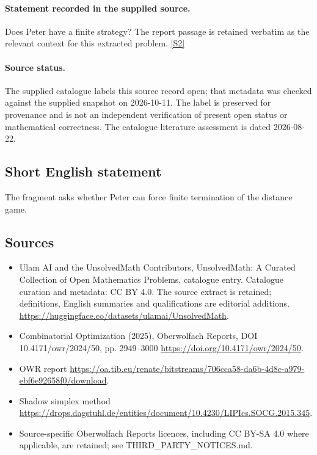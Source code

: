 \documentclass[11pt]{article}
\newcommand{\sref}[2]{\hyperlink{source:#1:#2}{[S#2]}}
\begin{document}
\paragraph{Statement recorded in the supplied source.}
Does Peter have a ﬁnite strategy? The report passage is retained verbatim as the relevant context for this extracted problem. \sref{statement}{2}
\paragraph{Source status.}
The supplied catalogue labels this source record open; that metadata was checked against the supplied snapshot on 2026-10-11. The label is preserved for provenance and is not an independent verification of present open status or mathematical correctness. The catalogue literature assessment is dated 2026-08-22.
\subsection{Short English statement}
The fragment asks whether Peter can force finite termination of the distance game.
\subsection{Sources}
\begin{itemize}
\item[\hypertarget{source:statement:1}{S1}] Ulam AI and the UnsolvedMath Contributors, UnsolvedMath: A Curated Collection of Open Mathematics Problems, catalogue entry. Catalogue curation and metadata: CC BY 4.0. The source extract is retained; definitions, English summaries and qualifications are editorial additions.
\url{https://huggingface.co/datasets/ulamai/UnsolvedMath}.
\item[\hypertarget{source:statement:2}{S2}] Combinatorial Optimization (2025), Oberwolfach Reports, DOI 10.4171/owr/2024/50, pp. 2949--3000
\url{https://doi.org/10.4171/owr/2024/50}.
\item[\hypertarget{source:statement:3}{S3}] OWR report
\url{https://oa.tib.eu/renate/bitstreams/706cca58-da6b-4d8c-a979-ebf6e92658f0/download}.
\item[\hypertarget{source:statement:4}{S4}] Shadow simplex method
\url{https://drops.dagstuhl.de/entities/document/10.4230/LIPIcs.SOCG.2015.345}.
\item Source-specific Oberwolfach Reports licences, including CC BY-SA 4.0 where applicable, are retained; see THIRD\_PARTY\_NOTICES.md.
\end{itemize}
\end{document}
